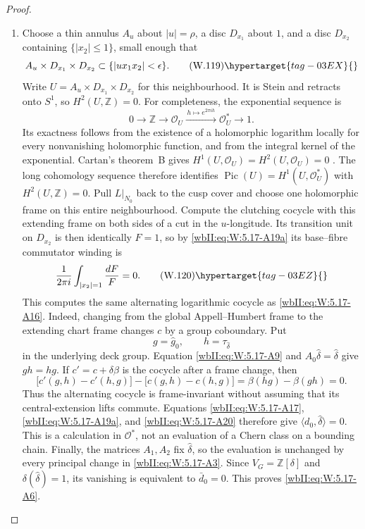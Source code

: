 \begin{proof}
\begin{enumerate}[label={$\langle1\rangle$\arabic*.},leftmargin=*]
\item Choose a thin annulus \(A_u\) about \(|u|=\rho\), a disc \(D_{x_1}\)
about \(1\), and a disc \(D_{x_2}\) containing \(\{|x_2|\le1\}\), small
enough that
\[
 A_u\times D_{x_1}\times D_{x_2}
 \subset\{|ux_1x_2|<\epsilon\}.
\tag{W.119}\hypertarget{tag-03EX}{}\label{wbII:eq:W:5.17-A19c}
\]
Write \(U=A_u\times D_{x_1}\times D_{x_2}\) for this neighbourhood.
It is Stein and retracts onto \(S^1\), so \(H^2(U,\mathbb Z)=0\).
For completeness, the exponential sequence is
\[
0\longrightarrow\mathbb Z\longrightarrow\mathcal O_U
 \xrightarrow{\,h\mapsto e^{2\pi i h}\,}\mathcal O_U^*
 \longrightarrow1.
\]
Its exactness follows from the existence of a holomorphic logarithm locally
for every nonvanishing holomorphic function, and from the integral kernel
of the exponential. Cartan's theorem~B gives
\(H^1(U,\mathcal O_U)=H^2(U,\mathcal O_U)=0\)
\cite[\S2, fundamental theorem~B, p.~80]{Cartan1957}.
The long cohomology sequence therefore identifies
\(\operatorname{Pic}(U)=H^1(U,\mathcal O_U^*)\) with
\(H^2(U,\mathbb Z)=0\). Pull \(L|_{N_0}\) back to
the cusp cover and choose one holomorphic frame on this entire
neighbourhood.  Compute the clutching cocycle with this extending frame on
both sides of a cut in the \(u\)-longitude.  Its transition unit on
\(D_{x_2}\) is then identically \(F=1\), so by \eqref{wbII:eq:W:5.17-A19a} its
base--fibre commutator winding is
\[
 \frac1{2\pi i}\int_{|x_2|=1}\frac{dF}{F}=0.
\tag{W.120}\hypertarget{tag-03EZ}{}\label{wbII:eq:W:5.17-A20}
\]
This computes the same alternating logarithmic cocycle as \eqref{wbII:eq:W:5.17-A16}.
Indeed, changing from the global Appell--Humbert frame to the extending
chart frame changes \(c\) by a group coboundary.  Put
\[
 g=\widehat g_0,
 \qquad
 h=\tau_{\widehat\delta}
\]
in the underlying deck group.  Equation \eqref{wbII:eq:W:5.17-A9} and
\(A_0\widehat\delta=\widehat\delta\) give \(gh=hg\).  If
\(c'=c+\delta\beta\) is the cocycle after a frame change, then
\[
 \bigl[c'(g,h)-c'(h,g)\bigr]
 -\bigl[c(g,h)-c(h,g)\bigr]
 =\beta(hg)-\beta(gh)=0.
\]
Thus the alternating cocycle is frame-invariant without assuming that its
central-extension lifts commute.  Equations \eqref{wbII:eq:W:5.17-A17}, \eqref{wbII:eq:W:5.17-A19a}, and
\eqref{wbII:eq:W:5.17-A20} therefore give
\(\langle d_0,\widehat\delta\rangle=0\).  This is a calculation in
\(\mathcal O^*\), not an evaluation of a Chern class on a bounding chain.
Finally, the matrices \(A_1,A_2\) fix
\(\widehat\delta\), so the evaluation is unchanged by every principal
change in \eqref{wbII:eq:W:5.17-A3}.  Since
\(V_G=\mathbb Z[\delta]\) and
\(\delta(\widehat\delta)=1\), its vanishing is equivalent to
\(\bar d_0=0\).  This proves \eqref{wbII:eq:W:5.17-A6}.

\end{enumerate}
\end{proof}
